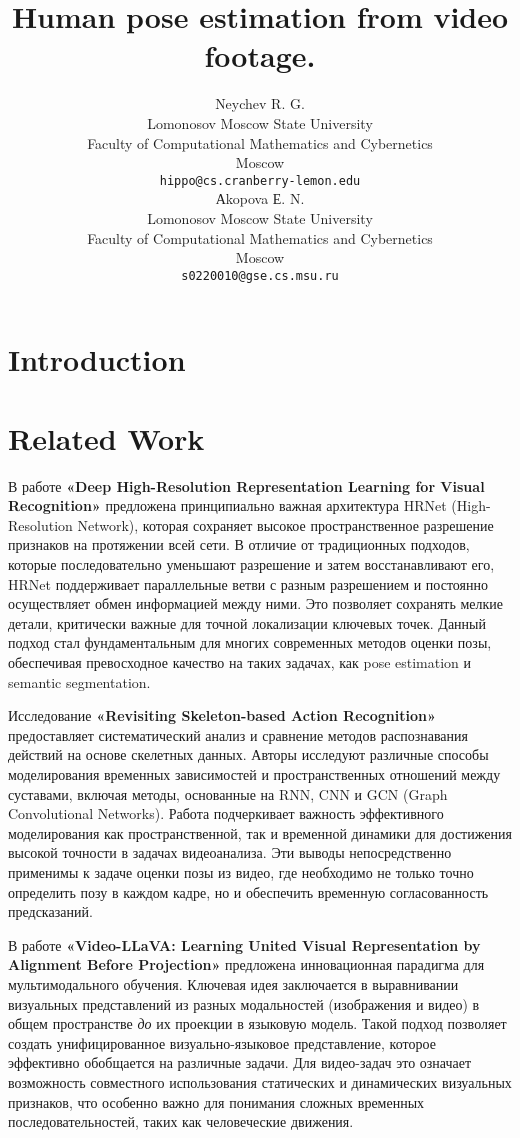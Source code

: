 \documentclass{article}
\title{Human pose estimation from video footage.}
\author{Neychev R. G.\\
	Lomonosov Moscow State University\\
	Faculty of Computational Mathematics and Cybernetics\\
	Moscow \\
	\texttt{hippo@cs.cranberry-lemon.edu} \\
	\And
	Аkopova Е. N.\\
	Lomonosov Moscow State University\\
	Faculty of Computational Mathematics and Cybernetics\\
	Moscow\\
	\texttt{s0220010@gse.cs.msu.ru} \\
}
\date{}
\begin{document}
\maketitle

\begin{abstract}

\end{abstract}


\section{Introduction}

\section{Related Work}


В работе \textbf{«Deep High-Resolution Representation Learning for Visual Recognition»} предложена принципиально важная архитектура HRNet (High-Resolution Network), которая сохраняет высокое пространственное разрешение признаков на протяжении всей сети. В отличие от традиционных подходов, которые последовательно уменьшают разрешение и затем восстанавливают его, HRNet поддерживает параллельные ветви с разным разрешением и постоянно осуществляет обмен информацией между ними. Это позволяет сохранять мелкие детали, критически важные для точной локализации ключевых точек. Данный подход стал фундаментальным для многих современных методов оценки позы, обеспечивая превосходное качество на таких задачах, как pose estimation и semantic segmentation.

Исследование \textbf{«Revisiting Skeleton-based Action Recognition»} предоставляет систематический анализ и сравнение методов распознавания действий на основе скелетных данных. Авторы исследуют различные способы моделирования временных зависимостей и пространственных отношений между суставами, включая методы, основанные на RNN, CNN и GCN (Graph Convolutional Networks). Работа подчеркивает важность эффективного моделирования как пространственной, так и временной динамики для достижения высокой точности в задачах видеоанализа. Эти выводы непосредственно применимы к задаче оценки позы из видео, где необходимо не только точно определить позу в каждом кадре, но и обеспечить временную согласованность предсказаний.

В работе \textbf{«Video-LLaVA: Learning United Visual Representation by Alignment Before Projection»} предложена инновационная парадигма для мультимодального обучения. Ключевая идея заключается в выравнивании визуальных представлений из разных модальностей (изображения и видео) в общем пространстве \textit{до} их проекции в языковую модель. Такой подход позволяет создать унифицированное визуально-языковое представление, которое эффективно обобщается на различные задачи. Для видео-задач это означает возможность совместного использования статических и динамических визуальных признаков, что особенно важно для понимания сложных временных последовательностей, таких как человеческие движения.
\end{document}
